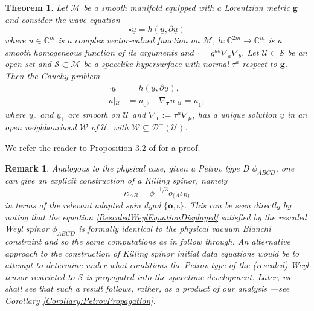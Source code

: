 \documentclass[10pt,a4paper]{article}
\theoremstyle{plain}
\newtheorem{theorem}{Theorem}
\newtheorem{remark}{Remark}
\def\bmg{{\bm g}}
\def\bmo{{\bm o}}
\begin{document}
\begin{theorem}
\label{TheoremHomogeneousWave}
 Let $\mathcal{M}$ be a smooth manifold equipped with a Lorentzian
 metric $\bmg$ and consider the wave equation
\[\square \underline{u}=h (\underline{u},\partial\underline{u})\]
where $\underline{u}\in\mathbb{C}^m$ is a complex vector-valued
function on $\mathcal{M}$, $h:\mathbb{C}^{2m}\rightarrow\mathbb{C}^m$
is a smooth homogeneous function of its arguments and
$\square=g^{ab}\nabla_{a}\nabla_{b}$.  Let
$\mathcal{U}\subset\mathcal{S}$ be an open set and $\mathcal{S}\subset
\mathcal{M}$ be a spacelike hypersurface with normal $\tau^{a}$
respect to $\bmg$. Then the Cauchy problem
\begin{align*}
\square \underline{u}&=h (\underline{u},
\partial\underline{u}),\\ \underline{u}\left|_{\mathcal{U}}\right.&=\underline{u}_0,
\quad
\nabla_{\bm\tau}\underline{u}\left|_{\mathcal{U}}\right.=\underline{u}_1,
\end{align*} 
where $\underline{u}_{0}$ and $\underline{u}_{1}$ are smooth on
$\mathcal{U}$ and $\nabla_{\bm\tau}:= \tau^\mu\nabla_\mu$, has a
unique solution $\underline{u}$ in an open neighbourhood $\mathcal{W}$ of
$\mathcal{U}$, with $\mathcal{W} \subseteq\mathcal{D}^+(\mathcal{U})$.
\end{theorem}
We refer the reader to Proposition 3.2 of \cite{Tay96c} for a proof.

\begin{remark}{\em 
Analogous to the physical case, given a Petrov type D $\phi_{ABCD}$,
one can give an explicit construction of a Killing spinor, namely
\begin{equation*}
\kappa_{AB} = \phi^{-1/3}o_{(A}\iota_{B)}
\end{equation*}
in terms of the relevant adapted spin dyad $\lbrace \bmo,
\bm\iota\rbrace$. This can be seen directly by noting that the
equation \eqref{RescaledWeylEquationDisplayed} satisfied by the
rescaled Weyl spinor $\phi_{ABCD}$ is formally identical to the
physical vacuum Bianchi constraint and so the same computations as in
\cite{WalkerPenrose70} follow through.  An alternative approach to the
construction of Killing spinor initial data equations would be to
attempt to determine under what conditions the Petrov type of the
(rescaled) Weyl tensor restricted to $\mathcal{S}$ is propagated into
the spacetime development. Later, we shall see that such a result
follows, rather, as a \emph{product} of our analysis ---see Corollary
\ref{Corollary:PetrovPropagation}.}\label{Remark:DyadExpressionForKillingSpinorInTypeD}
\end{remark}
\end{document}
